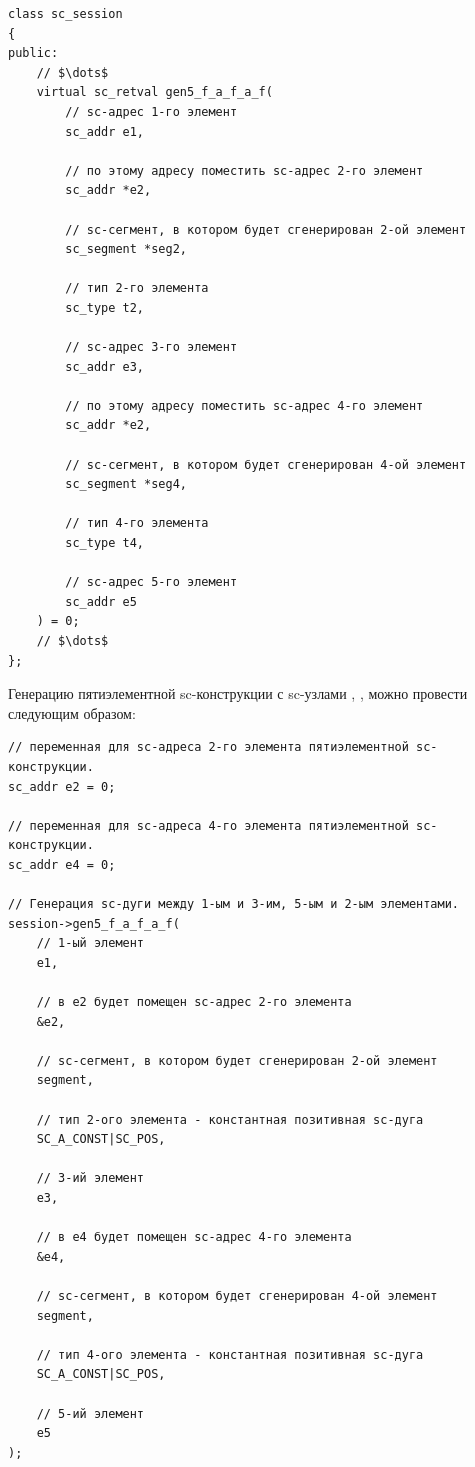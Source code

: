\begin{lstlisting}[texcl]
class sc_session
{
public:
    // $\dots$
    virtual sc_retval gen5_f_a_f_a_f(
        // sc-адрес 1-го элемент
        sc_addr e1,

        // по этому адресу поместить sc-адрес 2-го элемент
        sc_addr *e2,

        // sc-сегмент, в котором будет сгенерирован 2-ой элемент
        sc_segment *seg2, 

        // тип 2-го элемента
        sc_type t2,

        // sc-адрес 3-го элемент
        sc_addr e3,

        // по этому адресу поместить sc-адрес 4-го элемент
        sc_addr *e2,

        // sc-сегмент, в котором будет сгенерирован 4-ой элемент
        sc_segment *seg4,

        // тип 4-го элемента
        sc_type t4,

        // sc-адрес 5-го элемент
        sc_addr e5
    ) = 0;
    // $\dots$
};
\end{lstlisting}

Генерацию пятиэлементной sc-конструкции с sc-узлами ,
,  можно провести следующим образом:

\begin{lstlisting}[texcl]
// переменная для sc-адреса 2-го элемента пятиэлементной sc-конструкции.
sc_addr e2 = 0;

// переменная для sc-адреса 4-го элемента пятиэлементной sc-конструкции.
sc_addr e4 = 0;

// Генерация sc-дуги между 1-ым и 3-им, 5-ым и 2-ым элементами.
session->gen5_f_a_f_a_f(
    // 1-ый элемент
    e1,

    // в e2 будет помещен sc-адрес 2-го элемента
    &e2,

    // sc-сегмент, в котором будет сгенерирован 2-ой элемент
    segment,

    // тип 2-ого элемента - константная позитивная sc-дуга
    SC_A_CONST|SC_POS,

    // 3-ий элемент
    e3,

    // в e4 будет помещен sc-адрес 4-го элемента
    &e4,

    // sc-сегмент, в котором будет сгенерирован 4-ой элемент
    segment,

    // тип 4-ого элемента - константная позитивная sc-дуга
    SC_A_CONST|SC_POS,

    // 5-ий элемент
    e5
);
\end{lstlisting}

